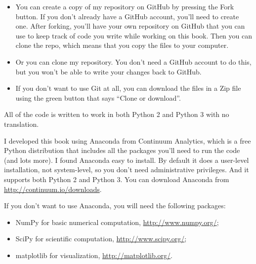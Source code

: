 \documentclass[12pt]{book}
\theoremstyle{exercise}
\begin{document}
\begin{itemize}

\item You can create a copy of my repository
on GitHub by pressing the {\sf Fork} button.  If you don't already
have a GitHub account, you'll need to create one.  After forking, you'll
have your own repository on GitHub that you can use to keep track
of code you write while working on this book.  Then you can
clone the repo, which means that you copy the files
to your computer.


\item Or you can clone my repository.  You don't need a GitHub account
  to do this, but you won't be able to write your changes back to
  GitHub.


\item If you don't want to use Git at all, you can download the files
  in a Zip file using the green button that says ``Clone or download''.

\end{itemize}

All of the code is written to work in both Python 2 and Python 3
with no translation.

I developed this book using Anaconda from Continuum Analytics, which
is a free Python distribution that includes all the packages you'll
need to run the code (and lots more).  I found Anaconda easy to
install.  By default it does a user-level installation, not
system-level, so you don't need administrative privileges.  And it
supports both Python 2 and Python 3.  You can download Anaconda from
\url{http://continuum.io/downloads}.


If you don't want to use Anaconda, you will need the following
packages:

\begin{itemize}

\item NumPy for basic numerical computation, \url{http://www.numpy.org/};

\item SciPy for scientific computation,
  \url{http://www.scipy.org/};

\item matplotlib for visualization, \url{http://matplotlib.org/}.

\end{itemize}
\end{document}

